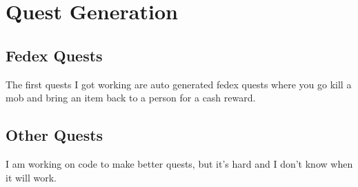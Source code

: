 \chapter{Quest Generation}

\section{Fedex Quests}

The first quests I got working are auto generated fedex quests where you
go kill a mob and bring an item back to a person for a cash reward.

\section{Other Quests}

I am working on code to make better quests, but it's hard and I don't know
when it will work.

